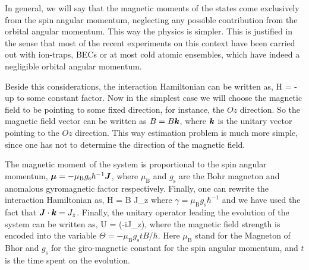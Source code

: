 In general, we will say that the magnetic moments of the states come exclusively from the spin angular momentum, neglecting any possible contribution from the orbital angular momentum.
This way the physics is simpler.
This is justified in the sense that most of the recent experiments on this context have been carried out with ion-traps, BECs or at most cold atomic ensembles, which have indeed a negligible orbital angular momentum.

Beside this considerations, the interaction Hamiltonian can be written as,
\be
  H = - \bs{\mu} \cdot {}
\ee
up to some constant factor.
Now in the simplest case we will choose the magnetic field to be pointing to some fixed direction, for instance, the $Oz$ direction.
So the magnetic field vector can be written as ${B}=B\boldsymbol{k}$, where $\boldsymbol{k}$ is the unitary vector pointing to the $Oz$ direction.
This way estimation problem is much more simple, since one has not to determine the direction of the magnetic field.

The magnetic moment of the system is proportional to the spin angular momentum, $\boldsymbol{\mu}=-\mu_\text{B} g_{\text{s}}\hbar^{-1} \boldsymbol{J}$, where $\mu_{\text{B}}$ and $g_{\text{s}}$ are the Bohr magneton and anomalous gyromagnetic factor respectively.
Finally, one can rewrite the interaction Hamiltonian as,
\be
  H = \gamma B J_z
\ee
where $\gamma = \mu_\text{B} g_{\text{s}}\hbar^{-1}$ and we have used the fact that $\boldsymbol{J}\cdot\boldsymbol{k}=J_z$.
Finally, the unitary operator leading the evolution of the system can be written as,
\be
  U = \exp(-i\Theta J_z),
\ee
where the magnetic field strength is encoded into the variable $\Theta=-\mu_\text{B} g_\text{s} t B/\hbar$.
Here $\mu_\text{B}$ stand for the Magneton of Bhor and $g_\text{s}$ for the giro-magnetic constant for the spin angular momentum, and $t$ is the time spent on the evolution.
